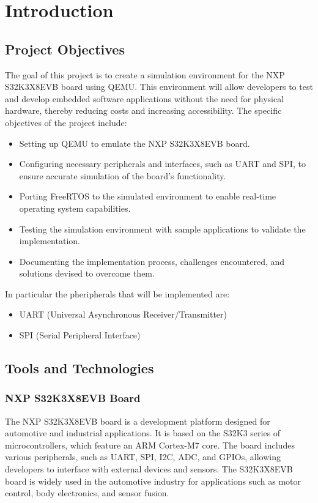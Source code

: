 \chapter{Introduction}

\section{Project Objectives}

The goal of this project is to create a simulation environment for the NXP S32K3X8EVB board using QEMU. This environment will allow developers to test and develop embedded software applications without the need for physical hardware, thereby reducing costs and increasing accessibility. The specific objectives of the project include:
\begin{itemize}
    \item Setting up QEMU to emulate the NXP S32K3X8EVB board.
    \item Configuring necessary peripherals and interfaces, such as UART and SPI, to ensure accurate simulation of the board's functionality.
    \item Porting FreeRTOS to the simulated environment to enable real-time operating system capabilities.
    \item Testing the simulation environment with sample applications to validate the implementation.
    \item Documenting the implementation process, challenges encountered, and solutions devised to overcome them.
\end{itemize}

In particular the pheripherals that will be implemented are:
\begin{itemize}
    \item UART (Universal Asynchronous Receiver/Transmitter)
    \item SPI (Serial Peripheral Interface)
\end{itemize}

\section{Tools and Technologies}

\subsection{NXP S32K3X8EVB Board}

The NXP S32K3X8EVB board is a development platform designed for automotive and industrial applications. It is based on the S32K3 series of microcontrollers, which feature an ARM Cortex-M7 core. The board includes various peripherals, such as UART, SPI, I2C, ADC, and GPIOs, allowing developers to interface with external devices and sensors. The S32K3X8EVB board is widely used in the automotive industry for applications such as motor control, body electronics, and sensor fusion.

